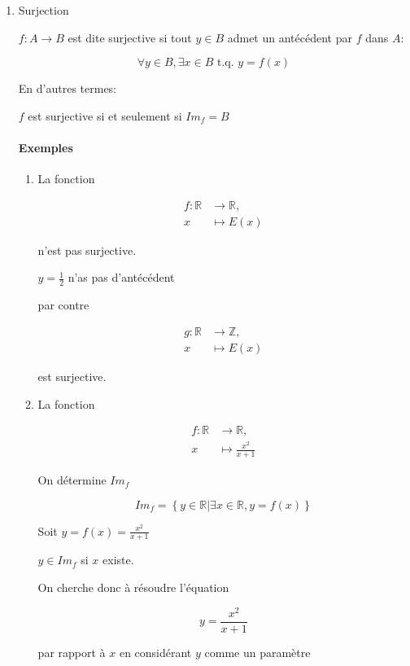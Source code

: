 \documentclass[
    11pt,
    a4paper,
    oneside,
    headinlcude, footinclude,
    twoside,
]{report}
\newcommand{\tq}[0]{\textrm{ t.q. }}
\begin{document}
\begin{enumerate}
\item Surjection

$f: A \to B$ est dite surjective si tout $y \in B$ admet un antécédent
par $f$ dans $A$:

$$\forall y \in B, \exists x \in B \tq y = f(x)$$

En d'autres termes:

\begin{center}
$f$ est surjective si et seulement si $Im_{f} = B$
\end{center}

\paragraph{Exemples}

\begin{enumerate}
\item La fonction

\[
\begin{split}
f : \mathbb{R} &\to \mathbb{R},\\
x &\mapsto E(x)
\end{split}
\]

n'est pas surjective.

$y = \frac{1}{2}$ n'as pas d'antécédent

par contre 

\[
\begin{split}
g: \mathbb{R} & \to \mathbb{Z},\\
x & \mapsto E(x)
\end{split}
\]

est surjective.

\item  La fonction

\[
\begin{split}
f : \mathbb{R} &\to \mathbb{R},\\
x &\mapsto \frac{x^{2}}{x+1}
\end{split}
\]

On détermine $Im_{f}$

$$Im_{f} = \left\{y \in \mathbb{R} | \exists x \in \mathbb{R}, y = f(x)\right\}$$

Soit $y = f(x) = \frac{x^{2}}{x+1}$ 

$y \in Im_{f}$ si $x$ existe.

On cherche donc à résoudre l'équation

$$y = \frac{x^{2}}{x+1}$$

par rapport à $x$ en considérant $y$ comme un paramètre


\end{enumerate}
\end{enumerate}
\end{document}
